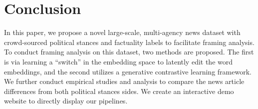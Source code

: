 \chapter{Conclusion}
In this paper, we propose a novel large-scale, multi-agency news dataset with crowd-sourced political stances and factuality labels to facilitate framing analysis. To conduct framing analysis on this dataset, two methods are proposed. The first is via learning a ``switch'' in the embedding space to latently edit the word embeddings, and the second utilizes a generative contrastive learning framework. We further conduct empirical studies and analysis to compare the news article differences from both political stances sides. We create an interactive demo website to directly display our pipelines.